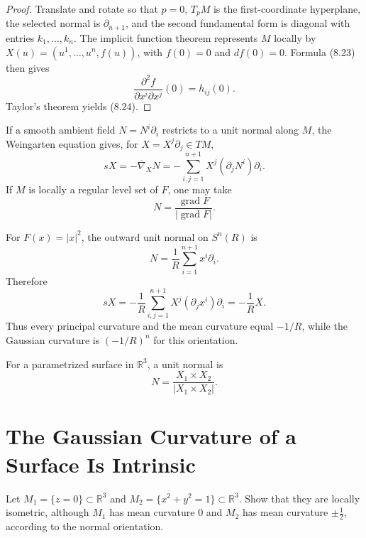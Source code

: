 \begin{proof}
\sketch
Translate and rotate so that $p=0$, $T_pM$ is the first-coordinate
hyperplane, the selected normal is $\partial_{n+1}$, and the second
fundamental form is diagonal with entries $k_1,\ldots,k_n$.  The implicit
function theorem represents $M$ locally by
$X(u)=(u^1,\ldots,u^n,f(u))$, with $f(0)=0$ and $df(0)=0$.  Formula (8.23)
then gives
\[
\frac{\partial^2f}{\partial x^i\partial x^j}(0)=h_{ij}(0).
\]
Taylor's theorem yields (8.24).
\end{proof}

If a smooth ambient field $N=N^i\partial_i$ restricts to a unit normal along
$M$, the Weingarten equation gives, for
$X=X^j\partial_j\in TM$,
\begin{equation}
sX=-\overline\nabla_XN
=-\sum_{i,j=1}^{n+1}X^j(\partial_jN^i)\partial_i. \tag{8.25}
\end{equation}
If $M$ is locally a regular level set of $F$, one may take
\[
N=\frac{\operatorname{grad}F}{|\operatorname{grad}F|}.
\]

\begin{example}
\label{ex:shape-operators-spheres}
For $F(x)=|x|^2$, the outward unit normal on $S^n(R)$ is
\[
N=\frac1R\sum_{i=1}^{n+1}x^i\partial_i.
\]
Therefore
\[
sX=-\frac1R\sum_{i,j=1}^{n+1}X^j(\partial_jx^i)\partial_i
=-\frac1RX.
\]
Thus every principal curvature and the mean curvature equal $-1/R$, while
the Gaussian curvature is $(-1/R)^n$ for this orientation.
\end{example}

For a parametrized surface in $\mathbb R^3$, a unit normal is
\begin{equation}
N=\frac{X_1\times X_2}{|X_1\times X_2|}. \tag{8.26}
\end{equation}

\section{The Gaussian Curvature of a Surface Is Intrinsic}

\begin{exercise}
\label{exer:plane-cylinder-isometric}
Let $M_1=\{z=0\}\subset\mathbb R^3$ and
$M_2=\{x^2+y^2=1\}\subset\mathbb R^3$.  Show that they are locally
isometric, although $M_1$ has mean curvature $0$ and $M_2$ has mean curvature
$\pm\tfrac12$, according to the normal orientation.
\end{exercise}

